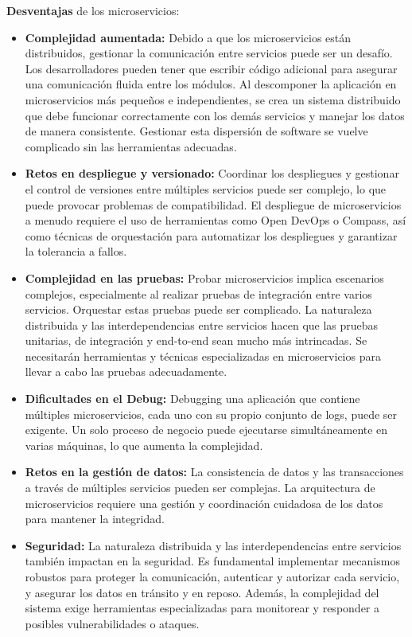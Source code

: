 \documentclass[12pt]{book}
\begin{document}
\textbf{Desventajas} de los microservicios:
\begin{itemize}
    \item \textbf{Complejidad aumentada:} Debido a que los microservicios están distribuidos, gestionar la comunicación entre servicios puede ser un desafío. Los desarrolladores pueden tener que escribir código adicional para asegurar una comunicación fluida entre los módulos. Al descomponer la aplicación en microservicios más pequeños e independientes, se crea un sistema distribuido que debe funcionar correctamente con los demás servicios y manejar los datos de manera consistente. Gestionar esta dispersión de software se vuelve complicado sin las herramientas adecuadas.
    \item \textbf{Retos en despliegue y versionado:} Coordinar los despliegues y gestionar el control de versiones entre múltiples servicios puede ser complejo, lo que puede provocar problemas de compatibilidad. El despliegue de microservicios a menudo requiere el uso de herramientas como Open DevOps o Compass, así como técnicas de orquestación para automatizar los despliegues y garantizar la tolerancia a fallos.
    \item \textbf{Complejidad en las pruebas:} Probar microservicios implica escenarios complejos, especialmente al realizar pruebas de integración entre varios servicios. Orquestar estas pruebas puede ser complicado. La naturaleza distribuida y las interdependencias entre servicios hacen que las pruebas unitarias, de integración y end-to-end sean mucho más intrincadas. Se necesitarán herramientas y técnicas especializadas en microservicios para llevar a cabo las pruebas adecuadamente.
    \item \textbf{Dificultades en el Debug:} Debugging una aplicación que contiene múltiples microservicios, cada uno con su propio conjunto de logs, puede ser exigente. Un solo proceso de negocio puede ejecutarse simultáneamente en varias máquinas, lo que aumenta la complejidad.
    \item \textbf{Retos en la gestión de datos:} La consistencia de datos y las transacciones a través de múltiples servicios pueden ser complejas. La arquitectura de microservicios requiere una gestión y coordinación cuidadosa de los datos para mantener la integridad.
    \item \textbf{Seguridad:} La naturaleza distribuida y las interdependencias entre servicios también impactan en la seguridad. Es fundamental implementar mecanismos robustos para proteger la comunicación, autenticar y autorizar cada servicio, y asegurar los datos en tránsito y en reposo. Además, la complejidad del sistema exige herramientas especializadas para monitorear y responder a posibles vulnerabilidades o ataques.
\end{itemize}
\end{document}
